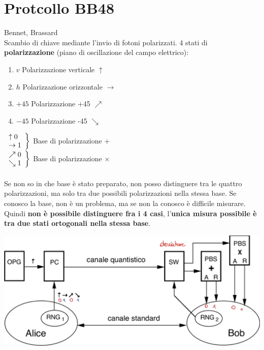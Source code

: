 \documentclass[10pt]{book}
\begin{document}
\section{Protcollo BB48} Bennet, Brassard\\
Scambio di chiave mediante l'invio di fotoni polarizzati. 4 stati di \textbf{polarizzazione} (piano di oscillazione del campo elettrico):
\begin{enumerate}
	\item $v$ Polarizzazione verticale $\uparrow$
	\item $h$ Polarizzazione orizzontale $\rightarrow$
	\item $+45$ Polarizzazione +45 $\nearrow$
	\item $-45$ Polarizzazione -45 $\searrow$
\end{enumerate}
$\left. \begin{array}{l l}
	\uparrow 0\\
	\rightarrow 1
\end{array}\right\}$ Base di polarizzazione $+$\\
$\left. \begin{array}{l l}
	\nearrow 0\\
	\searrow 1
\end{array}\right\}$ Base di polarizzazione $\times$\\\\
Se non so in che base è stato preparato, non posso distinguere tra le quattro polarizzazioni, ma solo tra due possibili polarizzazioni nella stessa base. Se conosco la base, non è un problema, ma se non la conosco è difficile misurare.\\
Quindi \textbf{non è possibile distinguere fra i 4 casi}, l'\textbf{unica misura possibile è tra due stati ortogonali nella stessa base}.
\pagebreak
\begin{center}
	\includegraphics[scale=0.5]{21.png}
\end{center}
\end{document}
